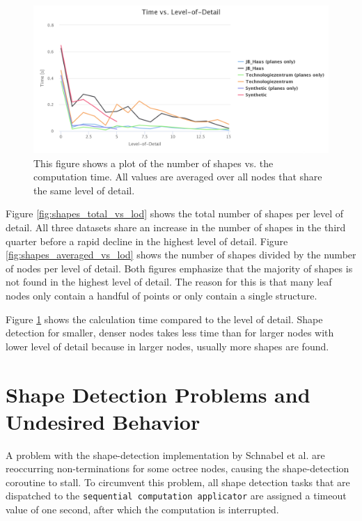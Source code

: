 \begin{figure}[h]
    \centering
    \includegraphics[width=1\textwidth]{Results/time_vs_lod.png}
    \caption[Plot of the number of shapes vs. the computation time]
        {This figure shows a plot of the number of shapes vs. the computation time. All values are averaged over all nodes that share the same level of detail.}
    \label{fig:time_vs_lod}
\end{figure}


Figure \ref{fig:shapes_total_vs_lod} shows the total number of shapes per level of detail. All three datasets share an increase in the number of shapes in the third quarter before a rapid decline in the highest level of detail. Figure \ref{fig:shapes_averaged_vs_lod} shows the number of shapes divided by the number of nodes per level of detail. Both figures emphasize that the majority of shapes is not found in the highest level of detail. The reason for this is that many leaf nodes only contain a handful of points or only contain a single structure. 

\par

Figure \ref{fig:time_vs_lod} shows the calculation time compared to the level of detail. Shape detection for smaller, denser nodes takes less time than for larger nodes with lower level of detail because in larger nodes, usually more shapes are found. 



\section{Shape Detection Problems and Undesired Behavior}
\label{sec:shape_detection_problems}

A problem with the shape-detection implementation by Schnabel et al. \cite{schnabel-2007-software} are reoccurring non-terminations for some octree nodes, causing the shape-detection coroutine to stall. To circumvent this problem, all shape detection tasks that are dispatched to the \verb|sequential computation applicator| are assigned a timeout value of one second, after which the computation is interrupted. 

